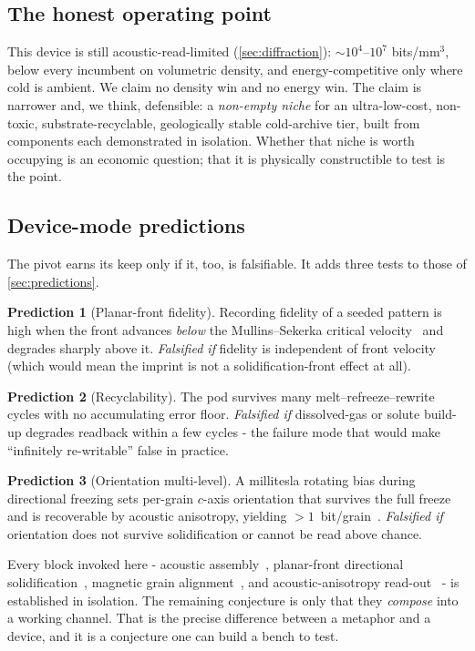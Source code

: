 \documentclass[11pt]{article}
\theoremstyle{definition}
\newtheorem{prediction}{Prediction}
\begin{document}
\subsection{The honest operating point}
This device is still acoustic-read-limited (\cref{sec:diffraction}): ${\sim}10^{4}$--$10^{7}$
bits/mm$^3$, below every incumbent on volumetric density, and energy-competitive only where
cold is ambient. We claim no density win and no energy win. The claim is narrower and, we
think, defensible: a \emph{non-empty niche} for an ultra-low-cost, non-toxic, substrate-recyclable,
geologically stable cold-archive tier, built from components each demonstrated in isolation.
Whether that niche is worth occupying is an economic question; that it is physically
constructible to test is the point.

\subsection{Device-mode predictions}
The pivot earns its keep only if it, too, is falsifiable. It adds three tests to those of
\cref{sec:predictions}.
\begin{prediction}[Planar-front fidelity]\label{pr:planar}
Recording fidelity of a seeded pattern is high when the front advances \emph{below} the
Mullins--Sekerka critical velocity~\cite{mullins1964stability} and degrades sharply above it.
\emph{Falsified if} fidelity is independent of front velocity (which would mean the imprint is
not a solidification-front effect at all).
\end{prediction}
\begin{prediction}[Recyclability]\label{pr:recycle}
The pod survives many melt--refreeze--rewrite cycles with no accumulating error floor.
\emph{Falsified if} dissolved-gas or solute build-up degrades readback within a few cycles -
the failure mode that would make ``infinitely re-writable'' false in practice.
\end{prediction}
\begin{prediction}[Orientation multi-level]\label{pr:orient}
A millitesla rotating bias during directional freezing sets per-grain $c$-axis orientation
that survives the full freeze and is recoverable by acoustic anisotropy, yielding
$>1$~bit/grain~\cite{porter2012magnetic}. \emph{Falsified if} orientation does not survive
solidification or cannot be read above chance.
\end{prediction}

Every block invoked here - acoustic assembly~\cite{melde2023assembly}, planar-front
directional solidification~\cite{mullins1964stability,deville2006freezecast}, magnetic grain
alignment~\cite{porter2012magnetic}, and acoustic-anisotropy read-out~\cite{anisimkin2021platewave} -
is established in isolation. The remaining conjecture is only that they \emph{compose} into a
working channel. That is the precise difference between a metaphor and a device, and it is a
conjecture one can build a bench to test.
\end{document}

